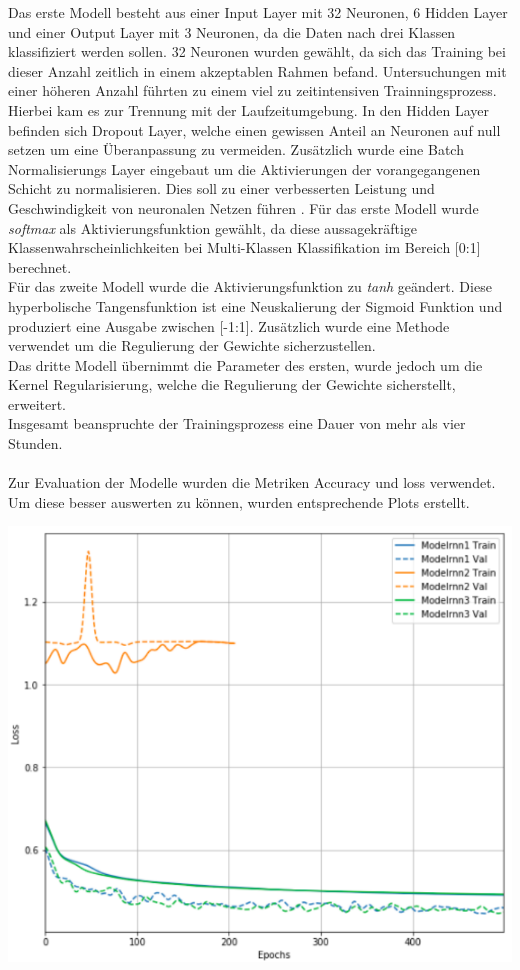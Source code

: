 \documentclass[
    12pt, %
    DIV10,
    ngerman, %
    a4paper, %
    oneside, %
    titlepage, %
    parskip=half, %
    headings=normal, %
    listof=totoc, %
    bibliography=totoc, %
    index=totoc, %
    captions=tableheading, %
    final %
]{scrreprt}
\begin{document}
Das erste Modell besteht aus einer Input Layer mit 32 Neuronen, 6 Hidden Layer und einer Output Layer mit 3 Neuronen, da die Daten nach drei Klassen klassifiziert werden sollen. 32 Neuronen wurden gewählt, da sich das Training bei dieser Anzahl zeitlich in einem akzeptablen Rahmen befand. Untersuchungen mit einer höheren Anzahl führten zu einem viel zu zeitintensiven Trainningsprozess. Hierbei kam es zur Trennung mit der Laufzeitumgebung. In den Hidden Layer befinden sich Dropout Layer, welche einen gewissen Anteil an Neuronen auf null setzen um eine Überanpassung zu vermeiden. Zusätzlich wurde eine Batch Normalisierungs Layer eingebaut um die Aktivierungen der vorangegangenen Schicht zu normalisieren. Dies soll zu einer verbesserten Leistung und Geschwindigkeit von neuronalen Netzen führen \parencite{Ioffe}. Für das erste Modell wurde \emph{softmax} als Aktivierungsfunktion gewählt, da diese aussagekräftige Klassenwahrscheinlichkeiten bei Multi-Klassen Klassifikation im Bereich [0:1] berechnet.\\
Für das zweite Modell wurde die Aktivierungsfunktion zu \emph{tanh} geändert. Diese hyperbolische Tangensfunktion ist eine Neuskalierung der Sigmoid Funktion und produziert eine Ausgabe zwischen [-1:1]. Zusätzlich wurde eine Methode verwendet um die Regulierung der Gewichte sicherzustellen.\\
Das dritte Modell übernimmt die Parameter des ersten, wurde jedoch um die Kernel Regularisierung, welche die Regulierung der Gewichte sicherstellt, erweitert.\\
Insgesamt beanspruchte der Trainingsprozess eine Dauer von mehr als vier Stunden.\\\\
Zur Evaluation der Modelle wurden die Metriken Accuracy und loss verwendet. Um diese besser auswerten zu können, wurden entsprechende Plots erstellt.
\begin{center}
\includegraphics[scale=0.7]{img/lossAll.pdf}
\label{fig:loss}
\end{center}
\end{document}
